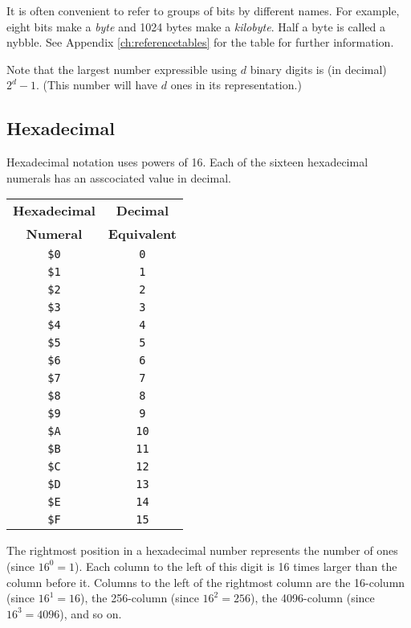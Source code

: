 It is often convenient to refer to groups of bits by different names. For example, eight bits make a {\it byte} and 1024 bytes make a {\it kilobyte}. Half a byte is called a nybble.
See Appendix \ref{ch:referencetables}  for the  table for further information.

Note that the largest number expressible using $d$ binary digits is (in decimal) $2^{d} - 1$. (This number will have $d$ ones in its representation.)

\subsection{Hexadecimal}
Hexadecimal notation uses powers of 16. Each of the sixteen hexadecimal numerals has an asscociated value in decimal.

\begin{center}
	\begin{tabular}{|c|c|}
		\hline
		{\bf Hexadecimal} & {\bf Decimal} \\
		{\bf Numeral} & {\bf Equivalent} \\ \hhline{|=|=|}
		\texttt{\$0} & \texttt{0} \\ \hline
		\texttt{\$1} & \texttt{1} \\ \hline
		\texttt{\$2} & \texttt{2} \\ \hline
		\texttt{\$3} & \texttt{3} \\ \hline
		\texttt{\$4} & \texttt{4} \\ \hline
		\texttt{\$5} & \texttt{5} \\ \hline
		\texttt{\$6} & \texttt{6} \\ \hline
		\texttt{\$7} & \texttt{7} \\ \hline
		\texttt{\$8} & \texttt{8} \\ \hline
		\texttt{\$9} & \texttt{9} \\ \hline
		\texttt{\$A} & \texttt{10} \\ \hline
		\texttt{\$B} & \texttt{11} \\ \hline
		\texttt{\$C} & \texttt{12} \\ \hline
		\texttt{\$D} & \texttt{13} \\ \hline
		\texttt{\$E} & \texttt{14} \\ \hline
		\texttt{\$F} & \texttt{15} \\ \hline
	\end{tabular}
\end{center}

The rightmost position in a hexadecimal number represents the number of ones (since $16^{0} = 1$). Each column to the left of this digit is 16 times larger than the column before it. Columns to the left of the rightmost column are the 16-column (since $16^{1} = 16$), the 256-column (since $16^{2} = 256$), the 4096-column (since $16^{3} = 4096$), and so on.


